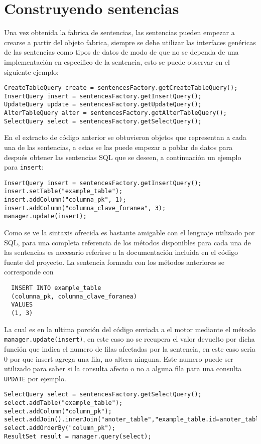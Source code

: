 \section{Construyendo sentencias}
%
%
Una vez obtenida la fabrica de sentencias, las sentencias pueden empezar a crearse a partir del objeto fabrica, siempre se debe utilizar las interfaces genéricas de las sentencias como tipos de datos de modo de que no se dependa de una implementación en especifico de la sentencia, esto se puede observar en el siguiente ejemplo:
%
\begin{lstlisting}[title=Uso de la fabrica de sentencias]
CreateTableQuery create = sentencesFactory.getCreateTableQuery();
InsertQuery insert = sentencesFactory.getInsertQuery();
UpdateQuery update = sentencesFactory.getUpdateQuery();
AlterTableQuery alter = sentencesFactory.getAlterTableQuery();
SelectQuery select = sentencesFactory.getSelectQuery();
\end{lstlisting}
%
En el extracto de código anterior se obtuvieron objetos que representan a cada una de las sentencias, a estas se las puede empezar a poblar de datos para después obtener las sentencias SQL que se deseen, a continuación un ejemplo para \verb=insert=:
%
\begin{lstlisting}[title=Uso de una sentencia INSERT]
InsertQuery insert = sentencesFactory.getInsertQuery();
insert.setTable("example_table");
insert.addColumn("columna_pk", 1);
insert.addColumn("columna_clave_foranea", 3);
manager.update(insert);
\end{lstlisting}
%
Como se ve la sintaxis ofrecida es bastante amigable con el lenguaje utilizado por SQL, para una completa referencia de los métodos disponibles para cada una de las sentencias es necesario referirse a la documentación incluida en el código fuente del proyecto. La sentencia formada con los métodos anteriores se corresponde con
\begin{Verbatim}
  INSERT INTO example_table 
  (columna_pk, columna_clave_foranea) 
  VALUES 
  (1, 3)
\end{Verbatim}
La cual es en la ultima porción del código enviada a el motor mediante el método \verb=manager.update(insert)=, en este caso no se recupera el valor devuelto por dicha función que indica el numero de filas afectadas por la sentencia, en este caso seria $0$ por que insert agrega una fila, no altera ninguna. Este numero puede ser utilizado para saber si la consulta afecto o no a alguna fila para una consulta \verb=UPDATE= por ejemplo.
%
\begin{lstlisting}[title=Uso de una sentencia SELECT]
SelectQuery select = sentencesFactory.getSelectQuery();
select.addTable("example_table");
select.addColumn("column_pk");
select.addJoin().innerJoin("anoter_table","example_table.id=anoter_table.id");
select.addOrderBy("column_pk");
ResultSet result = manager.query(select); 
\end{lstlisting}
